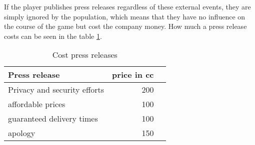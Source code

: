 If the player publishes press releases regardless of these external events, they are simply ignored by the population, which means that they have no influence on the course of the game but cost the company money. How much a press release costs can be seen in the table \ref{cost_press_releases}. 

\begin{table}[ht]
\centering
\begin{tabular}{|l|r|r|}
\hline
\textbf{Press release}        & \textbf{price in cc}   
\\ \hline
Privacy and security efforts  &    200 \\
affordable prices             &    100 \\
guaranteed delivery times     &    100 \\
apology                       &    150 \\
\hline
\end{tabular}
\caption{Cost press releases}
\label{cost_press_releases}
\end{table}

